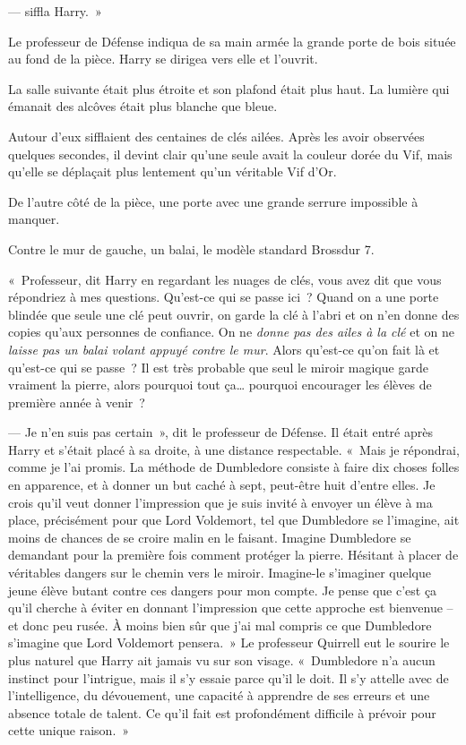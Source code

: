 ---  siffla Harry.~»

Le professeur de Défense indiqua de sa main armée la grande porte de bois située au fond de la pièce. Harry se dirigea vers elle et l'ouvrit.

\later

La salle suivante était plus étroite et son plafond était plus haut. La lumière qui émanait des alcôves était plus blanche que bleue.

Autour d'eux sifflaient des centaines de clés ailées. Après les avoir observées quelques secondes, il devint clair qu'une seule avait la couleur dorée du Vif, mais qu'elle se déplaçait plus lentement qu'un véritable Vif d'Or.

De l'autre côté de la pièce, une porte avec une grande serrure impossible à manquer.

Contre le mur de gauche, un balai, le modèle standard Brossdur 7.

«~Professeur, dit Harry en regardant les nuages de clés, vous avez dit que vous répondriez à mes questions. Qu'est-ce qui se passe ici~? Quand on a une porte blindée que seule une clé peut ouvrir, on garde la clé à l'abri et on n'en donne des copies qu'aux personnes de confiance. On ne \emph{donne pas des ailes à la clé} et on ne \emph{laisse pas un balai volant appuyé contre le mur}. Alors qu'est-ce qu'on fait là et qu'est-ce qui se passe~? Il est très probable que seul le miroir magique garde vraiment la pierre, alors pourquoi tout ça… pourquoi encourager les élèves de première année à venir~?

--- Je n'en suis pas certain~», dit le professeur de Défense. Il était entré après Harry et s'était placé à sa droite, à une distance respectable. «~Mais je répondrai, comme je l'ai promis. La méthode de Dumbledore consiste à faire dix choses folles en apparence, et à donner un but caché à sept, peut-être huit d'entre elles. Je crois qu'il veut donner l'impression que je suis invité à envoyer un élève à ma place, précisément pour que Lord Voldemort, tel que Dumbledore se l'imagine, ait moins de chances de se croire malin en le faisant. Imagine Dumbledore se demandant pour la première fois comment protéger la pierre. Hésitant à placer de véritables dangers sur le chemin vers le miroir. Imagine-le s'imaginer quelque jeune élève butant contre ces dangers pour mon compte. Je pense que c'est ça qu'il cherche à éviter en donnant l'impression que cette approche est bienvenue -- et donc peu rusée. À moins bien sûr que j'ai mal compris ce que Dumbledore s'imagine que Lord Voldemort pensera.~» Le professeur Quirrell eut le sourire le plus naturel que Harry ait jamais vu sur son visage. «~Dumbledore n'a aucun instinct pour l'intrigue, mais il s'y essaie parce qu'il le doit. Il s'y attelle avec de l'intelligence, du dévouement, une capacité à apprendre de ses erreurs et une absence totale de talent. Ce qu'il fait est profondément difficile à prévoir pour cette unique raison.~»


